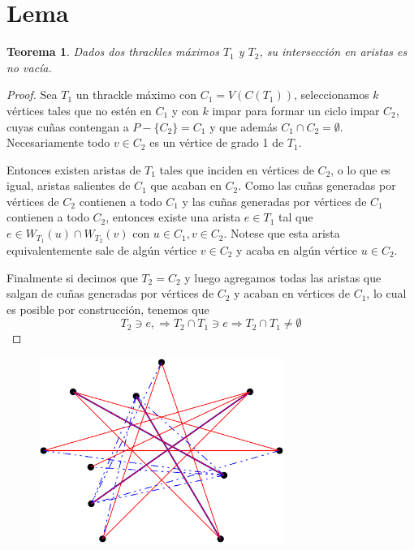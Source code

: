 \documentclass[11pt,helvetica,letter]{article}
\newtheorem{theorem}{Teorema}
\begin{document}
 \section{ Lema }
 \begin{theorem}
   Dados dos thrackles máximos $T_1$ y $T_2$, su intersección en aristas es no vacía.
 \end{theorem}
 \begin{proof}
 Sea $T_1$ un thrackle máximo con $C_1=V(C(T_1))$, seleccionamos $k$ vértices tales que no estén en $C_1$ y con $k$ impar
 para formar un ciclo impar $C_2$, cuyas cuñas contengan a $P-\{C_2\}= C_1$ y que además $C_1 \cap C_2 = \emptyset$. Necesariamente
 todo $v \in C_2$ es un vértice de grado 1 de $T_1$.

 Entonces existen aristas de $T_1$ tales que inciden en vértices de $C_2$, o lo que es igual,
 aristas salientes de $C_1$ que acaban en $C_2$. Como las cuñas generadas por vértices de $C_2$ contienen a todo $C_1$ y las
 cuñas generadas por vértices de $C_1$ contienen a todo $C_2$, entonces existe una arista $e\in T_1$
 tal que $e\in W_{T_1}(u) \cap W_{T_2}(v)$ con $u\in C_1, v\in C_2$. Notese que esta arista equivalentemente sale de algún vértice
 $v \in C_2$ y acaba en algún vértice $u \in C_2$.

 Finalmente si decimos que $T_2 = C_2$ y luego agregamos todas las aristas que salgan de cuñas generadas por vértices de $C_2$
 y acaban en vértices de $C_1$, lo cual es posible por construcción, tenemos que \[T_2 \ni  e, \Rightarrow T_2 \cap T_1 \ni e \Rightarrow T_2 \cap T_1 \neq \emptyset\]
\end{proof}

\begin{figure}[h]
  \centering
  \includegraphics[width=8cm]{lemathrackles}

\end{figure}
\end{document}
